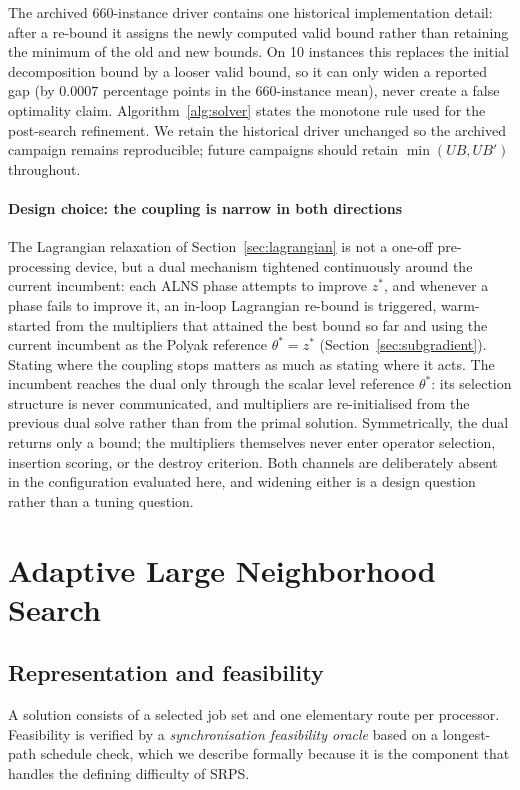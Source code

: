 \documentclass[preprint,12pt]{elsarticle}
\begin{document}
The archived 660-instance driver contains one historical implementation detail:
after a re-bound it assigns the newly computed valid bound rather than retaining
the minimum of the old and new bounds. On 10 instances this replaces the initial
decomposition bound by a looser valid bound, so it can only widen a reported gap
(by $0.0007$ percentage points in the 660-instance mean), never create a false
optimality claim. Algorithm~\ref{alg:solver} states the monotone rule used for
the post-search refinement. We retain the historical driver unchanged so the
archived campaign remains reproducible; future campaigns should retain
$\min(UB,UB')$ throughout.

\paragraph{Design choice: the coupling is narrow in both directions}
\label{sec:alns-lb-coupling}
The Lagrangian relaxation of Section~\ref{sec:lagrangian} is not a one-off
pre-processing device, but a dual mechanism tightened continuously around
the current incumbent: each ALNS phase attempts to improve $z^*$, and whenever a
phase fails to improve it, an in-loop Lagrangian re-bound is triggered,
warm-started from the multipliers that attained the best bound so far and using
the current incumbent as the Polyak reference $\theta^* = z^*$
(Section~\ref{sec:subgradient}). Stating where the coupling stops matters as
much as stating where it acts. The incumbent reaches the dual only through the
scalar level reference $\theta^*$: its selection structure is never communicated,
and multipliers are re-initialised from the previous dual solve rather than from
the primal solution. Symmetrically, the dual returns only a bound; the multipliers
themselves never enter operator selection, insertion scoring, or the destroy
criterion. Both channels are deliberately absent in the configuration evaluated
here, and widening either is a design question rather than a tuning question.

\section{Adaptive Large Neighborhood Search}\label{sec:alns}

\subsection{Representation and feasibility}

A solution consists of a selected job set and one elementary route per processor. Feasibility is verified by a \emph{synchronisation feasibility oracle} based on a longest-path schedule check, which we describe formally because it is the component that handles the defining difficulty of SRPS.
\end{document}
